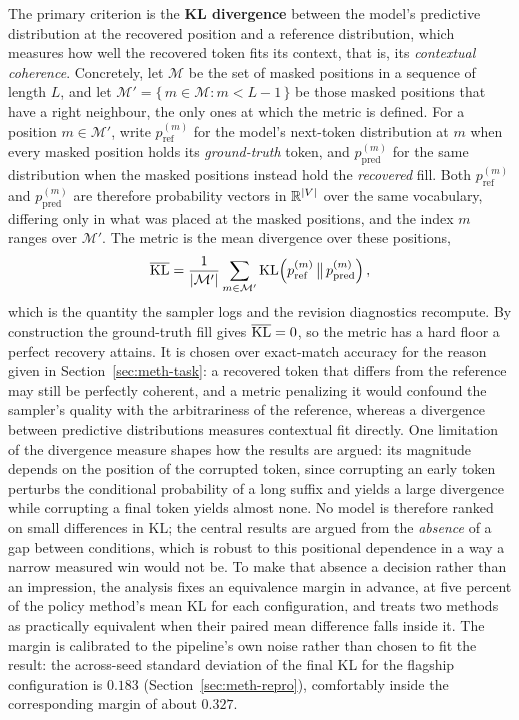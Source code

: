 The primary criterion is the \textbf{KL divergence} \citep{kullback1951information} between the model's predictive distribution at the recovered position and a reference distribution, which measures how well the recovered token fits its context, that is, its \emph{contextual coherence}. Concretely, let $\mathcal{M}$ be the set of masked positions in a sequence of length $L$, and let $\mathcal{M}' = \{\, m \in \mathcal{M} : m < L-1 \,\}$ be those masked positions that have a right neighbour, the only ones at which the metric is defined. For a position $m \in \mathcal{M}'$, write $p^{(m)}_{\text{ref}}$ for the model's next-token distribution at $m$ when every masked position holds its \emph{ground-truth} token, and $p^{(m)}_{\text{pred}}$ for the same distribution when the masked positions instead hold the \emph{recovered} fill. Both $p^{(m)}_{\text{ref}}$ and $p^{(m)}_{\text{pred}}$ are therefore probability vectors in $\mathbb{R}^{|V|}$ over the same vocabulary, differing only in what was placed at the masked positions, and the index $m$ ranges over $\mathcal{M}'$. The metric is the mean divergence over these positions,
\begin{equation}
    \overline{\operatorname{KL}} = \frac{1}{|\mathcal{M}'|} \sum_{m \in \mathcal{M}'} \operatorname{KL}\!\left(p^{(m)}_{\text{ref}} \,\big\|\, p^{(m)}_{\text{pred}}\right),
    \label{eq:meth-kl}
\end{equation}
which is the quantity the sampler logs and the revision diagnostics recompute. By construction the ground-truth fill gives $\overline{\operatorname{KL}} = 0$, so the metric has a hard floor a perfect recovery attains. It is chosen over exact-match accuracy for the reason given in Section~\ref{sec:meth-task}: a recovered token that differs from the reference may still be perfectly coherent, and a metric penalizing it would confound the sampler's quality with the arbitrariness of the reference, whereas a divergence between predictive distributions measures contextual fit directly. One limitation of the divergence measure shapes how the results are argued: its magnitude depends on the position of the corrupted token, since corrupting an early token perturbs the conditional probability of a long suffix and yields a large divergence while corrupting a final token yields almost none. No model is therefore ranked on small differences in KL; the central results are argued from the \emph{absence} of a gap between conditions, which is robust to this positional dependence in a way a narrow measured win would not be. To make that absence a decision rather than an impression, the analysis fixes an equivalence margin in advance, at five percent of the policy method's mean KL for each configuration, and treats two methods as practically equivalent when their paired mean difference falls inside it. The margin is calibrated to the pipeline's own noise rather than chosen to fit the result: the across-seed standard deviation of the final KL for the flagship configuration is $0.183$ (Section~\ref{sec:meth-repro}), comfortably inside the corresponding margin of about $0.327$.
